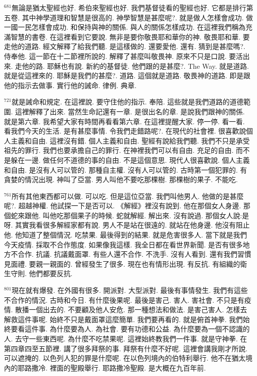 \documentclass{book}
\begin{document}
$^{681}$無論是猶太聖經也好.
希伯來聖經也好.
我們基督徒看的聖經也好.
它都是排行第五卷.
其中神學道理和智慧是很高的.
神學智慧是甚麼呢?.
就是做人怎樣會成功.
做一國一民怎樣會成功.
和保持與神的關係.
與人的關係怎樣成功.
在這裡我們稱為充滿智慧的書卷.
在這裡看到它要說.
無非是要你敬畏耶和華你的神.
敬畏耶和華.
要走他的道路.
經文解釋了給我們聽.
是這樣做的.
還要愛他.
還有.
猜到是甚麼嗎?.
侍奉他.
這一節在十二節裡所說的.
解釋了甚麼叫敬畏神.
原來不只是口說.
要活出來.
走他的路.
耶穌也有說.
新約的基督徒.
他們跟的是甚麼?.
The Way.
就是道路.
就是從這裡來的.
耶穌是我們的甚麼?.
道路.
這個就是道路.
敬畏神的道路.
即是跟他的指示去做事.
實行他的誡命.
律例.
典章.

$^{721}$就是誡命和規定.
在這裡說.
要守住他的指示.
奉陪.
這些就是我們道路的道德範圍.
這裡解釋了出來.
當然生命記還有一章.
是很出名的章.
是說我們跟神的關係.
就是第六章.
我希望大家有時間再看看第六章.
在這裡提醒大家.
停一停.
看一看.
看我們今天的生活.
是有甚麼事情.
令我們走錯路呢?.
在現代的社會裡.
很喜歡說個人主義和自由.
這裡沒有錯.
個人主義和自由.
聖經有說給我們聽.
我們不只是承受祖先的罪行.
我們也要承擔自己的罪行.
在神裡我們可以有自由.
充足的自由.
而不是躲在一邊.
做任何不道德的事的自由.
不是這個意思.
現代人很喜歡說.
個人主義和自由.
是沒有人可以管的.
那種自主權.
沒有人可以管的.
古時第一個犯罪的.
有貪婪的情況出現.
神叫了亞當.
男人叫他不要吃那棵樹.
那棵樹的果子.
不能吃.

$^{761}$所有其他東西都可以做.
可以吃.
但是這位亞當.
我們叫他男人.
他做的是甚麼呢?.
超越神權.
他試探一下是否可以.
《解經》裡沒有說到.
他在那個女人身邊.
那個蛇來跟他.
叫他吃那個果子的時候.
蛇就解經.
解出來.
沒有說過.
那個女人說:是呀.
其實我看很多解經家都有說.
男人不是站在很遠的.
就站在他身邊.
他沒有阻止他.
他知道了整個情況.
吃禁果.
最後得到的結果.
就是危害很多人.
當下就是我們今天疫情.
採取不合作態度.
如果像我這樣.
我全日都在看世界新聞.
是否有很多地方不合作.
抗議.
抗議戴面罩.
有些人還不合作.
不洗手.
沒有人看到.
還有我們習慣見面禮.
要親一親面的.
曾經發生了很多.
現在也有情形出現.
有反抗.
有組織的衛生守則.
他們都要反抗.

$^{801}$現在就有爆發.
在外國有很多.
開派對.
大型派對.
最後有事情發生.
我們有這些不合作的情況.
古時和今日.
有什麼後果呢.
最後是害己.
害人.
害社會.
不只是有疫情.
散播一個出去的.
不要顧及他人安危.
那一種想法和做法.
是害己害人.
怎樣去解救這件事呢.
始終不只是戴面罩這麼簡單.
我們要再看的.
就是俯首神拳.
我們始終要看這件事.
為什麼要為人.
為社會.
要有功德和公益.
為什麼要為一個不認識的人.
去守一些東西呢.
為什麼不吃禁果呢.
這裡始終教我們一件事.
就是守神拳.
在第四章四至五節裡.
講了很多拜祭的事.
拜祭有什麼不好呢.
這裡會講我剛才所說.
可以遮掩的.
以色列人犯的罪是什麼呢.
在以色列境內的伯特利舉行.
他不在猶太境內的耶路撒冷.
裡面的聖殿舉行.
耶路撒冷聖殿.
是大概在九百年前.
\end{document}
